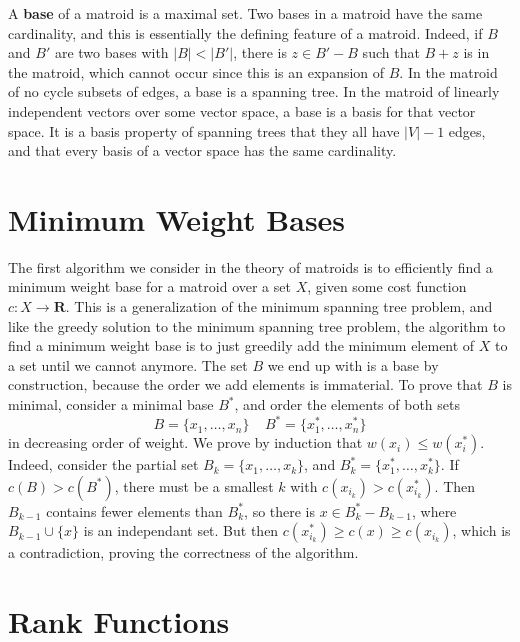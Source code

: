 A {\bf base} of a matroid is a maximal set. Two bases in a matroid have the same cardinality, and this is essentially the defining feature of a matroid. Indeed, if $B$ and $B'$ are two bases with $|B| < |B'|$, there is $z \in B' - B$ such that $B + z$ is in the matroid, which cannot occur since this is an expansion of $B$. In the matroid of no cycle subsets of edges, a base is a spanning tree. In the matroid of linearly independent vectors over some vector space, a base is a basis for that vector space. It is a basis property of spanning trees that they all have $|V| - 1$ edges, and that every basis of a vector space has the same cardinality.

\section{Minimum Weight Bases}

The first algorithm we consider in the theory of matroids is to efficiently find a minimum weight base for a matroid over a set $X$, given some cost function $c: X \to \mathbf{R}$. This is a generalization of the minimum spanning tree problem, and like the greedy solution to the minimum spanning tree problem, the algorithm to find a minimum weight base is to just greedily add the minimum element of $X$ to a set until we cannot anymore. The set $B$ we end up with is a base by construction, because the order we add elements is immaterial. To prove that $B$ is minimal, consider a minimal base $B^*$, and order the elements of both sets
%
\[ B = \{ x_1, \dots, x_n \}\ \ \ \ \ B^* = \{ x_1^*, \dots, x_n^* \} \]
%
in decreasing order of weight. We prove by induction that $w(x_i) \leq w(x_i^*)$. Indeed, consider the partial set $B_k = \{ x_1, \dots, x_k \}$, and $B_k^* = \{ x_1^*, \dots, x_k^* \}$. If $c(B) > c(B^*)$, there must be a smallest $k$ with $c(x_{i_k}) > c(x_{i_k}^*)$. Then $B_{k-1}$ contains fewer elements than $B_k^*$, so there is $x \in B_k^* - B_{k-1}$, where $B_{k-1} \cup \{ x \}$ is an independant set. But then $c(x_{i_k}^*) \geq c(x) \geq c(x_{i_k})$, which is a contradiction, proving the correctness of the algorithm.

\section{Rank Functions}

